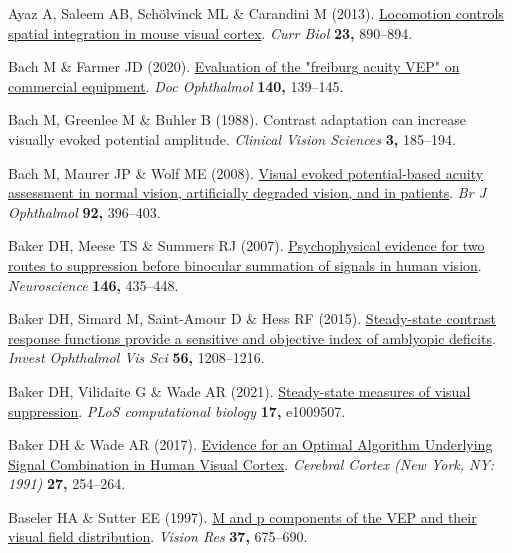 \documentclass[
  letterpaper,
  DIV=11,
  numbers=noendperiod]{scrartcl}
\newlength{\cslhangindent}
\newenvironment{CSLReferences}[2] %
 {\begin{list}{}{%
  \setlength{\itemindent}{0pt}
  \setlength{\leftmargin}{0pt}
  \setlength{\parsep}{0pt}
  \ifodd #1
   \setlength{\leftmargin}{\cslhangindent}
   \setlength{\itemindent}{-1\cslhangindent}
  \fi
  \setlength{\itemsep}{#2\baselineskip}}}
 {\end{list}}
\begin{document}
\begin{CSLReferences}{1}{1}
Ayaz A, Saleem AB, Schölvinck ML \& Carandini M (2013).
\href{https://doi.org/10.1016/j.cub.2013.04.012}{Locomotion controls
spatial integration in mouse visual cortex}. \emph{Curr Biol}
\textbf{23,} 890--894.

Bach M \& Farmer JD (2020).
\href{https://doi.org/10.1007/s10633-019-09726-2}{Evaluation of the
"freiburg acuity VEP" on commercial equipment}. \emph{Doc Ophthalmol}
\textbf{140,} 139--145.

Bach M, Greenlee M \& Buhler B (1988). Contrast adaptation can increase
visually evoked potential amplitude. \emph{Clinical Vision Sciences}
\textbf{3,} 185--194.

Bach M, Maurer JP \& Wolf ME (2008).
\href{https://doi.org/10.1136/bjo.2007.130245}{Visual evoked
potential-based acuity assessment in normal vision, artificially
degraded vision, and in patients}. \emph{Br J Ophthalmol} \textbf{92,}
396--403.

Baker DH, Meese TS \& Summers RJ (2007).
\href{https://doi.org/10.1016/j.neuroscience.2007.01.030}{Psychophysical
evidence for two routes to suppression before binocular summation of
signals in human vision}. \emph{Neuroscience} \textbf{146,} 435--448.

Baker DH, Simard M, Saint-Amour D \& Hess RF (2015).
\href{https://doi.org/10.1167/iovs.14-15611}{Steady-state contrast
response functions provide a sensitive and objective index of amblyopic
deficits}. \emph{Invest Ophthalmol Vis Sci} \textbf{56,} 1208--1216.

Baker DH, Vilidaite G \& Wade AR (2021).
\href{https://doi.org/10.1371/journal.pcbi.1009507}{Steady-state
measures of visual suppression}. \emph{PLoS computational biology}
\textbf{17,} e1009507.

Baker DH \& Wade AR (2017).
\href{https://doi.org/10.1093/cercor/bhw395}{Evidence for an {Optimal}
{Algorithm} {Underlying} {Signal} {Combination} in {Human} {Visual}
{Cortex}}. \emph{Cerebral Cortex (New York, NY: 1991)} \textbf{27,}
254--264.

Baseler HA \& Sutter EE (1997).
\href{https://doi.org/10.1016/s0042-6989(96)00209-x}{M and p components
of the VEP and their visual field distribution}. \emph{Vision Res}
\textbf{37,} 675--690.


\end{CSLReferences}
\end{document}
